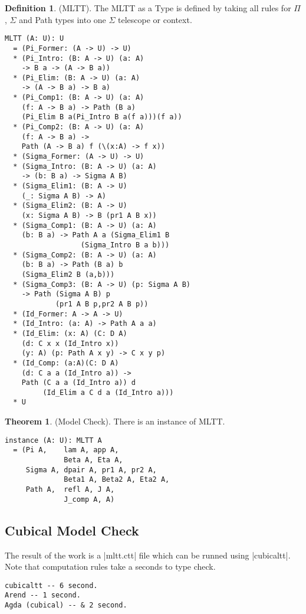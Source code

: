 \documentclass{article}
\theoremstyle{definition}
\newtheorem{theorem}{Theorem}
\newtheorem{definition}{Definition}
\begin{document}
\begin{definition} (MLTT).
The MLTT as a Type is defined by taking all rules
for $\Pi$, $\Sigma$ and Path types into one $\Sigma$ telescope or context.
\begin{lstlisting}[mathescape=true]
MLTT (A: U): U
  = (Pi_Former: (A -> U) -> U)
  * (Pi_Intro: (B: A -> U) (a: A)
    -> B a -> (A -> B a))
  * (Pi_Elim: (B: A -> U) (a: A)
    -> (A -> B a) -> B a)
  * (Pi_Comp1: (B: A -> U) (a: A)
    (f: A -> B a) -> Path (B a)
    (Pi_Elim B a(Pi_Intro B a(f a)))(f a))
  * (Pi_Comp2: (B: A -> U) (a: A)
    (f: A -> B a) ->
    Path (A -> B a) f (\(x:A) -> f x))
  * (Sigma_Former: (A -> U) -> U)
  * (Sigma_Intro: (B: A -> U) (a: A)
    -> (b: B a) -> Sigma A B)
  * (Sigma_Elim1: (B: A -> U)
    (_: Sigma A B) -> A)
  * (Sigma_Elim2: (B: A -> U)
    (x: Sigma A B) -> B (pr1 A B x))
  * (Sigma_Comp1: (B: A -> U) (a: A)
    (b: B a) -> Path A a (Sigma_Elim1 B
                  (Sigma_Intro B a b)))
  * (Sigma_Comp2: (B: A -> U) (a: A)
    (b: B a) -> Path (B a) b
    (Sigma_Elim2 B (a,b)))
  * (Sigma_Comp3: (B: A -> U) (p: Sigma A B)
    -> Path (Sigma A B) p
            (pr1 A B p,pr2 A B p))
  * (Id_Former: A -> A -> U)
  * (Id_Intro: (a: A) -> Path A a a)
  * (Id_Elim: (x: A) (C: D A)
    (d: C x x (Id_Intro x))
    (y: A) (p: Path A x y) -> C x y p)
  * (Id_Comp: (a:A)(C: D A)
    (d: C a a (Id_Intro a)) ->
    Path (C a a (Id_Intro a)) d
         (Id_Elim a C d a (Id_Intro a)))
  * U
\end{lstlisting}
\end{definition}

\begin{theorem} (Model Check).
There is an instance of MLTT.
\begin{lstlisting}
instance (A: U): MLTT A
  = (Pi A,    lam A, app A,
              Beta A, Eta A,
     Sigma A, dpair A, pr1 A, pr2 A,
              Beta1 A, Beta2 A, Eta2 A,
     Path A,  refl A, J A,
              J_comp A, A)
\end{lstlisting}
\end{theorem}

\subsection*{Cubical Model Check}

The result of the work is a |mltt.ctt| file which can be runned using |cubicaltt|.
Note that computation rules take a seconds to type check.

\begin{lstlisting}
cubicaltt -- 6 second.
Arend -- 1 second.
Agda (cubical) -- & 2 second.
\end{lstlisting}
\end{document}
